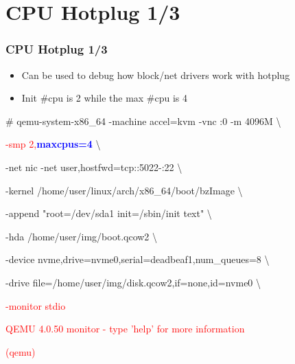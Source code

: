 \documentclass[aspectratio=169]{beamer}
\begin{document}

\section{CPU Hotplug 1/3}
\begin{frame}
\frametitle{CPU Hotplug 1/3}
\begin{itemize}
\item Can be used to debug how block/net drivers work with hotplug
\item Init \#cpu is 2 while the max \#cpu is 4
\end{itemize}
\begin{block}{}

\# qemu-system-x86\_64 -machine accel=kvm -vnc :0 -m 4096M \textbackslash

\textcolor{red}{-smp 2,\textbf{\textcolor{blue}{maxcpus=4}}} \textbackslash

-net nic -net user,hostfwd=tcp::5022-:22 \textbackslash

-kernel /home/user/linux/arch/x86\_64/boot/bzImage \textbackslash
	
-append "root=/dev/sda1 init=/sbin/init text" \textbackslash

-hda /home/user/img/boot.qcow2 \textbackslash

-device nvme,drive=nvme0,serial=deadbeaf1,num\_queues=8 \textbackslash

-drive file=/home/user/img/disk.qcow2,if=none,id=nvme0 \textbackslash

\textcolor{red}{-monitor stdio}

\textcolor{red}{QEMU 4.0.50 monitor - type 'help' for more information}

\textcolor{red}{(qemu)}
\end{block}
\end{frame}

\end{document}
